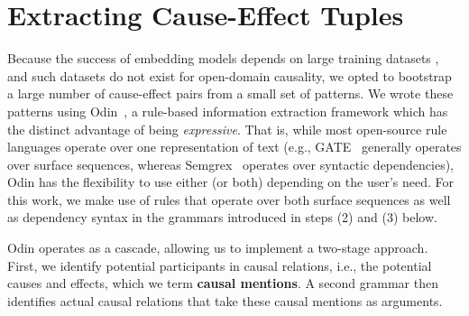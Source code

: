 
\section{Extracting Cause-Effect Tuples}
\label{sec-emnlp2016:causalextraction}


Because the success of embedding models depends on large training datasets \citep{sharp-EtAl:2015:NAACL-HLT}, and such datasets do not exist for open-domain causality, we opted to bootstrap a large number of cause-effect pairs from a small set of patterns.
%
We wrote these patterns using Odin~\citep{valenzuela2016runes}, a rule-based information extraction framework which has the distinct advantage of 
being \emph{expressive}.  That is, while most open-source rule languages operate over one representation of text (e.g., GATE~\citep{Cunningham2011a} generally operates over surface sequences, whereas Semgrex~\citep{chambers2007learning} operates over syntactic dependencies), Odin has the flexibility to use either (or both) depending on the user's need.  
For this work, we make use of rules that operate over both surface sequences as well as dependency syntax in the grammars introduced in steps (2) and (3) below.

Odin operates as a cascade, %
allowing us to implement a two-stage approach.
First, we identify potential participants in causal relations, i.e., the potential causes and effects, which we term {\bf causal mentions}. A second grammar then identifies actual causal relations that take these causal mentions as arguments.

